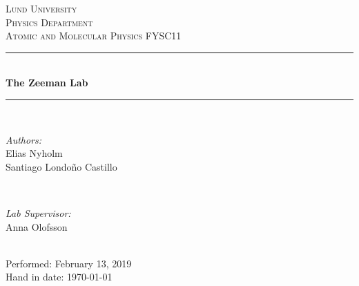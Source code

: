 \documentclass[12pt]{article}
\begin{document}
\begin{titlepage}
\newcommand{\HRule}{\rule{\linewidth}{0.5mm}}

\center 

\textsc{\LARGE Lund University}\\[1.5cm] 
\textsc{\Large Physics Department }\\[0.5cm]
\textsc{\Large Atomic and Molecular Physics FYSC11}\\[0.5cm]


\HRule \\[0.4cm]
{ \huge \bfseries The Zeeman Lab}\\[0.4cm]
\HRule \\[1.5cm]

\begin{minipage}{0.4\textwidth}
\begin{flushleft} \large
\emph{Authors:}\\
Elias Nyholm\\
Santiago Londo{\~n}o Castillo\\
\end{flushleft}
\end{minipage}
~
\begin{minipage}{0.4\textwidth}
\begin{flushright} \large
\emph{Lab Supervisor:} \\
Anna Olofsson\\

 



\end{flushright}
\end{minipage}\\[2cm]

{\large Performed: February 13, 2019  \\ Hand in date: \today}\\[1cm] 


\end{titlepage}
\end{document}
